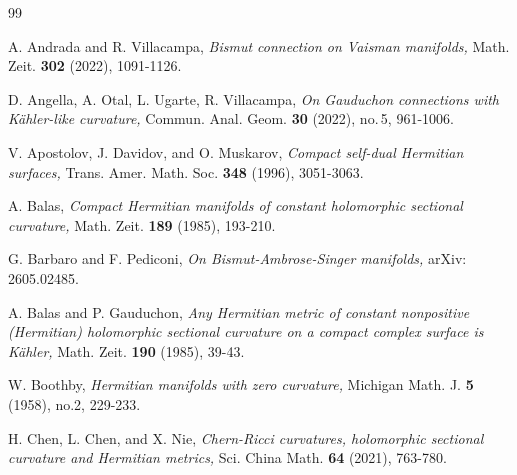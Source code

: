 \documentclass{amsart}
\begin{document}
\begin{thebibliography}{99}


  A. Andrada and R. Villacampa, \emph{Bismut connection on Vaisman manifolds,} Math. Zeit. {\bf 302} (2022), 1091-1126.

  D. Angella, A. Otal, L. Ugarte, R. Villacampa,  \emph{On Gauduchon connections with K\"ahler-like curvature,}  Commun. Anal. Geom. \textbf{30} (2022), no.\,5, 961-1006.


 V. Apostolov, J. Davidov, and O. Muskarov, \emph{Compact self-dual Hermitian surfaces,} Trans. Amer. Math. Soc. {\bf 348} (1996),  3051-3063.

 A. Balas, \emph{Compact Hermitian manifolds of constant holomorphic sectional curvature, } Math. Zeit. {\bf 189} (1985),  193-210.

 {G. Barbaro and F. Pediconi,
\emph{On Bismut-Ambrose-Singer manifolds,}
arXiv: 2605.02485.
}

  A. Balas and P. Gauduchon, \emph{Any Hermitian metric of constant nonpositive (Hermitian) holomorphic sectional curvature on a compact complex surface is K\"ahler, } Math. Zeit. {\bf 190} (1985), 39-43.




 W. Boothby, \emph{Hermitian manifolds with zero curvature,} Michigan Math. J. {\bf 5} (1958), no.2, 229-233.

  H. Chen, L. Chen, and X. Nie, \emph{Chern-Ricci curvatures, holomorphic sectional curvature and  Hermitian metrics,}  Sci. China Math. {\bf 64} (2021), 763-780.



\end{thebibliography}
\end{document}
